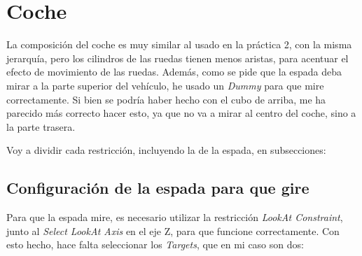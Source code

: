 \section{Coche}

La composición del coche es muy similar al usado en la práctica 2, con la misma jerarquía, pero los cilindros de las ruedas tienen menos aristas, para acentuar el efecto de movimiento de las ruedas. Además, como se pide que la espada deba mirar a la parte superior del vehículo, he usado un \textit{Dummy} para que mire correctamente. Si bien se podría haber hecho con el cubo de arriba, me ha parecido más correcto hacer esto, ya que no va a mirar al centro del coche, sino a la parte trasera.

\bigskip

Voy a dividir cada restricción, incluyendo la de la espada, en subsecciones:


\subsection{Configuración de la espada para que gire}

Para que la espada mire, es necesario utilizar la restricción \textit{LookAt Constraint}, junto al \textit{Select LookAt Axis} en el eje Z, para que funcione correctamente. Con esto hecho, hace falta seleccionar los \textit{Targets}, que en mi caso son dos:

